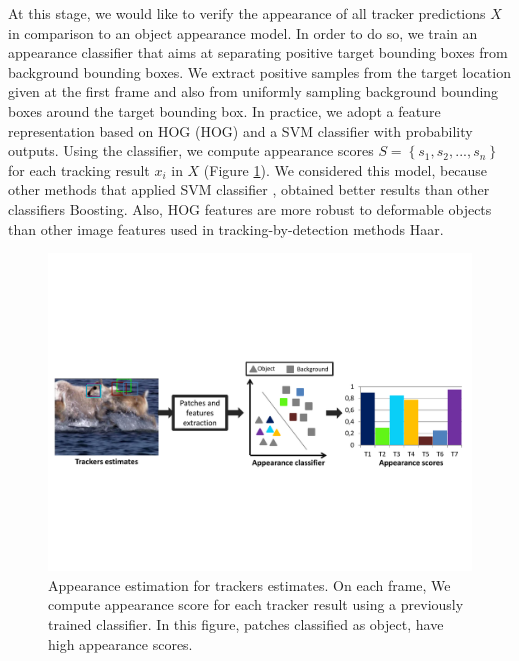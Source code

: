 At this stage, we would like to verify the appearance of all tracker
predictions $X$ in comparison to an object appearance model.
In order to do so, we train an appearance classifier that aims at separating
positive target bounding boxes from background bounding boxes.
We extract positive samples from the target location given at the first frame
and also from uniformly sampling background bounding boxes around the target
bounding box.
In practice, we adopt a feature representation based on \gls{HOG} (HOG) and a SVM
classifier with probability outputs.
Using the classifier, we compute appearance scores  
$S = \left \{ s_1, s_2, ..., s_n \right \}$ for each tracking result $x_i$ in
$X$ (Figure \ref{fig::svm_app}). We considered this model, because other methods
that applied SVM classifier \cite{zhang2014meem,Bai2013}, obtained better results
than other classifiers \eg Boosting.
Also, HOG features are
more robust to deformable objects than other image features used in
tracking-by-detection methods \eg Haar.

\begin{figure}[h!]
\centering
\includegraphics[page=1, width=1\linewidth, trim= 0.2cm 6cm 0.2cm 6.5cm,
                 clip=true]{Figures/figures_mod}
\caption[Appearance estimation for trackers estimates.]
        {\small Appearance estimation for trackers estimates. On each frame,
        We compute appearance score for each tracker result using a previously
        trained classifier. In this figure, patches classified as object, have high
        appearance scores.}
\label{fig::svm_app}
\end{figure}


